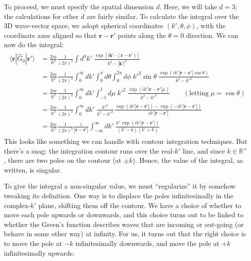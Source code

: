 \documentclass[pra,12pt]{revtex4}
\begin{document}
To proceed, we must specify the spatial dimension $d$.  Here, we will
take $d = 3$; the calculations for other $d$ are fairly similar.  To
calculate the integral over the 3D wave-vector space, we adopt
spherical coordinates $(k',\theta,\phi)$, with the coordinate axes
aligned so that $\mathbf{r}-\mathbf{r}'$ points along the $\theta=0$
direction.  We can now do the integral:
\begin{align}
  \begin{aligned}\langle\mathbf{r}|\hat{G}_0|\mathbf{r}'\rangle &= \frac{2m}{\hbar^2} \frac{1}{(2\pi)^3} \int d^3k' \; \frac{\exp\left[i\mathbf{k}'\cdot (\mathbf{r}-\mathbf{r}')\right]}{k^2-|\mathbf{k}'|^2} \\ &= \frac{2m}{\hbar^2} \frac{1}{(2\pi)^3} \int_0^\infty dk' \int_0^\pi d\theta \int_{0}^{2\pi} d\phi \;{k'}^{2}\sin\theta\; \frac{\displaystyle \exp\left(ik'|\mathbf{r}-\mathbf{r}'|\cos\theta\right)}{k^2-{k'}^2} \\ &= \frac{2m}{\hbar^2} \frac{1}{(2\pi)^2} \int_0^\infty dk' \int_{-1}^1 d\mu \;{k'}^2\; \frac{\displaystyle \exp\left(ik'|\mathbf{r}-\mathbf{r}'|\mu\right)}{k^2-{k'}^2} \qquad(\text{letting}\;\mu = \cos\theta) \\ &= \frac{2m}{\hbar^2} \frac{1}{(2\pi)^2} \int_0^\infty dk' \; \frac{ {k'}^2}{k^2-{k'}^2}\, \frac{\displaystyle \exp\left(ik'|\mathbf{r}-\mathbf{r}'|\right) - \exp\left(-ik'|\mathbf{r}-\mathbf{r}'|\right)}{ik'|\mathbf{r}-\mathbf{r}'|} \\ &= \frac{2m}{\hbar^2} \frac{1}{(2\pi)^2} \frac{i}{|\mathbf{r}-\mathbf{r}'|} \int_{-\infty}^\infty dk' \; \frac{\displaystyle k'\, \exp\left(ik'|\mathbf{r}-\mathbf{r}'|\right)}{(k' - k)(k'+k)}\end{aligned}
\end{align}
This looks like something we can handle with contour integration
techniques.  But there's a snag: the integration contour runs over the
real-$k'$ line, and since $k \in \mathbb{R}^+$, there are two poles
on the contour (at $\pm k$).  Hence, the value of the integral, as
written, is singular.

To give the integral a non-singular value, we must ``regularize'' it
by somehow tweaking its definition.  One way is to displace the poles
infinitesimally in the complex-$k'$ plane, shifting them off the
contour.  We have a choice of whether to move each pole upwards or
downwards, and this choice turns out to be linked to whether the
Green's function describes waves that are incoming or out-going (or
behave in some other way) at infinity.  For us, it turns out that the
right choice is to move the pole at $-k$ infinitesimally downwards,
and move the pole at $+k$ infinitesimally upwards:
\end{document}
